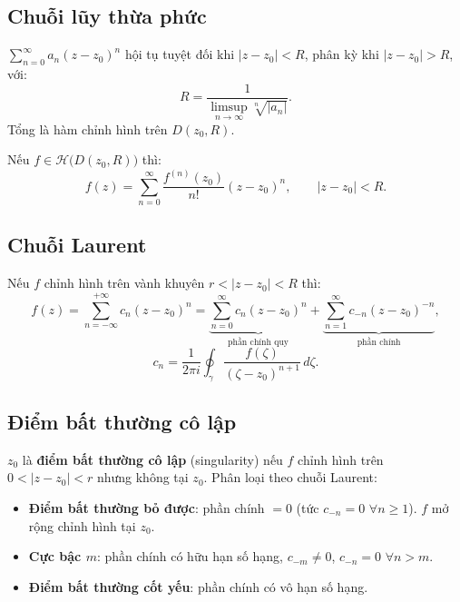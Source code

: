 \documentclass[12pt,a4paper]{article}
\begin{document}
\subsection{Chuỗi lũy thừa phức}

\begin{dinhly}[title={Bán kính hội tụ}]
  $\displaystyle\sum_{n=0}^{\infty} a_n(z - z_0)^n$ hội tụ tuyệt đối khi $|z - z_0| < R$, phân kỳ khi $|z - z_0| > R$, với:
  \[
    R = \frac{1}{\displaystyle\limsup_{n \to \infty} \sqrt[n]{|a_n|}}.
  \]
  Tổng là hàm chỉnh hình trên $D(z_0, R)$.
\end{dinhly}

\begin{dinhly}[title={Khai triển Taylor}]
  Nếu $f \in \mathcal{H}\bigl(D(z_0, R)\bigr)$ thì:
  \[
    f(z) = \sum_{n=0}^{\infty} \frac{f^{(n)}(z_0)}{n!}(z - z_0)^n, \qquad |z - z_0| < R.
  \]
\end{dinhly}

\subsection{Chuỗi Laurent}

\begin{dinhly}[title={Khai triển Laurent}]
  Nếu $f$ chỉnh hình trên vành khuyên $r < |z - z_0| < R$ thì:
  \[
    f(z) = \sum_{n=-\infty}^{+\infty} c_n(z - z_0)^n = \underbrace{\sum_{n=0}^{\infty} c_n(z - z_0)^n}_{\text{phần chính quy}} + \underbrace{\sum_{n=1}^{\infty} c_{-n}(z - z_0)^{-n}}_{\text{phần chính}},
  \]
  \[
    c_n = \frac{1}{2\pi i}\oint_\gamma \frac{f(\zeta)}{(\zeta - z_0)^{n+1}}\,d\zeta.
  \]
\end{dinhly}

\subsection{Điểm bất thường cô lập}

\begin{dinhnghia}
  $z_0$ là \textbf{điểm bất thường cô lập} (singularity) nếu $f$ chỉnh hình trên $0 < |z - z_0| < r$ nhưng không tại $z_0$. Phân loại theo chuỗi Laurent:
  \begin{itemize}
    \item \textbf{Điểm bất thường bỏ được}: phần chính $= 0$ (tức $c_{-n} = 0$ $\forall n \ge 1$). $f$ mở rộng chỉnh hình tại $z_0$.
    \item \textbf{Cực bậc $m$}: phần chính có hữu hạn số hạng, $c_{-m} \ne 0$, $c_{-n} = 0$ $\forall n > m$.
    \item \textbf{Điểm bất thường cốt yếu}: phần chính có vô hạn số hạng.
  \end{itemize}
\end{dinhnghia}
\end{document}
